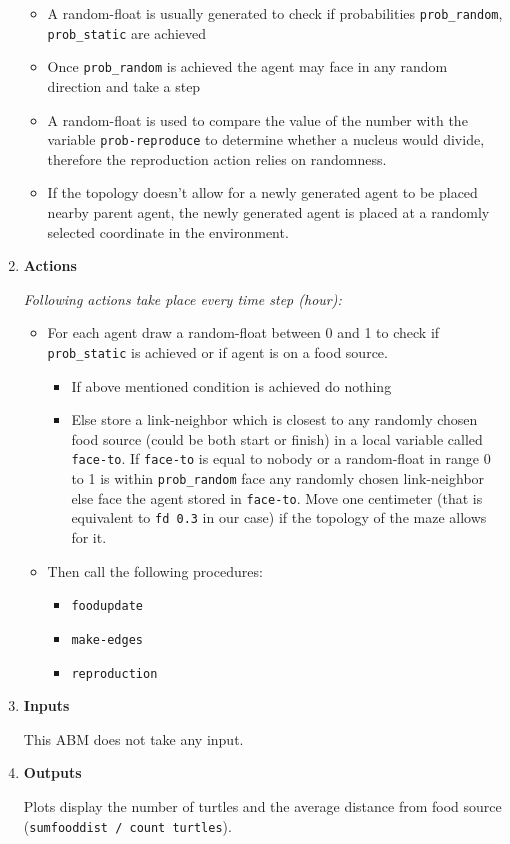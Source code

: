 \documentclass[a4paper, 11pt]{article}
\begin{document}
\begin{enumerate}
\begin{itemize}
        \item A random-float is usually generated to check if probabilities \texttt{prob\_random}, \texttt{prob\_static} are achieved
        \item Once \texttt{prob\_random} is achieved the agent may face in any random direction and take a step
        \item A random-float is used to compare the value of the number with the variable \texttt{prob-reproduce} to determine whether a nucleus would divide, therefore the reproduction action relies on randomness.  
        \item If the topology doesn't allow for a newly generated agent to be placed nearby parent agent, the newly generated agent is placed at a randomly selected coordinate in the environment.
    \end{itemize}
    \item \textbf{Actions}\par
    \textit{Following actions take place every time step (hour):}
    \begin{itemize}
        \item For each agent draw a random-float between 0 and 1 to check if \texttt{prob\_static} is achieved or if agent is on a food source.
        \begin{itemize}
            \item If above mentioned condition is achieved do nothing
            \item Else store a link-neighbor which is closest to any randomly chosen food source (could be both start or finish) in a local variable called \texttt{face-to}. If \texttt{face-to} is equal to nobody or a random-float in range 0 to 1 is within \texttt{prob\_random} face any randomly chosen link-neighbor else face the agent stored in \texttt{face-to}. Move one centimeter (that is equivalent to \texttt{fd 0.3} in our case) if the topology of the maze allows for it.
        \end{itemize}
        \item Then call the following procedures: 
        \begin{itemize}
            \item \texttt{foodupdate}
            \item \texttt{make-edges}
            \item \texttt{reproduction}
        \end{itemize}
    \end{itemize}
    
    \item \textbf{Inputs} \par
    This ABM does not take any input.
    \item \textbf{Outputs} \par
    Plots display the number of turtles and the average distance from food source (\texttt{sumfooddist / count turtles}).
    \end{enumerate}
\newpage
\end{document}
